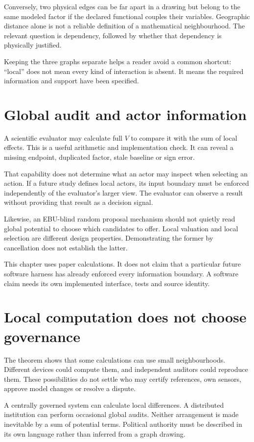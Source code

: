Conversely, two physical edges can be far apart in a drawing but belong to the same modeled factor if the declared functional couples their variables. Geographic distance alone is not a reliable definition of a mathematical neighbourhood. The relevant question is dependency, followed by whether that dependency is physically justified.

Keeping the three graphs separate helps a reader avoid a common shortcut: ``local'' does not mean every kind of interaction is absent. It means the required information and support have been specified.

\section{Global audit and actor information}
A scientific evaluator may calculate full $V$ to compare it with the sum of local effects. This is a useful arithmetic and implementation check. It can reveal a missing endpoint, duplicated factor, stale baseline or sign error.

That capability does not determine what an actor may inspect when selecting an action. If a future study defines local actors, its input boundary must be enforced independently of the evaluator's larger view. The evaluator can observe a result without providing that result as a decision signal.

Likewise, an EBU-blind random proposal mechanism should not quietly read global potential to choose which candidates to offer. Local valuation and local selection are different design properties. Demonstrating the former by cancellation does not establish the latter.

This chapter uses paper calculations. It does not claim that a particular future software harness has already enforced every information boundary. A software claim needs its own implemented interface, tests and source identity.

\section{Local computation does not choose governance}
The theorem shows that some calculations can use small neighbourhoods. Different devices could compute them, and independent auditors could reproduce them. These possibilities do not settle who may certify references, own sensors, approve model changes or resolve a dispute.

A centrally governed system can calculate local differences. A distributed institution can perform occasional global audits. Neither arrangement is made inevitable by a sum of potential terms. Political authority must be described in its own language rather than inferred from a graph drawing.

